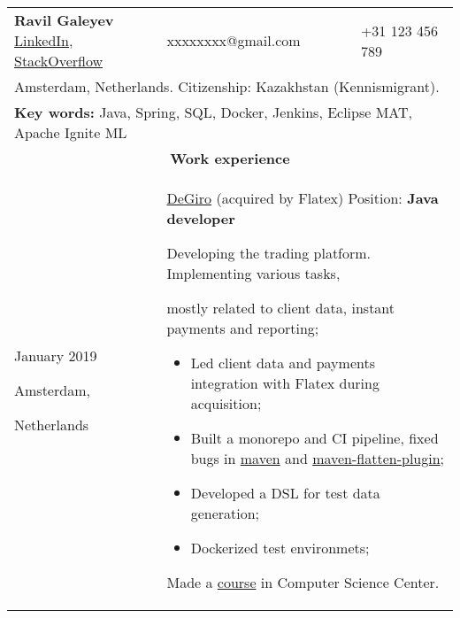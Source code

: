 \documentclass{article}
\begin{document}
\begin{longtable}{p{0.00in}p{0.00in}p{0.0in}p{0.00in}p{0.00in}}
\multicolumn{3}{p{\dimexpr3.00in+4\tabcolsep\relax}}{{\fontsize{16pt}{19.2pt}\selectfont
    \textbf{Ravil Galeyev}}
    \href{https://www.linkedin.com/in/ravil-galeyev-9a7540102}{LinkedIn},
    \href{http://stackoverflow.com/story/dehasi}{StackOverflow}
} &
\multicolumn{1}{l}{xxxxxxxx@gmail.com} &
\multicolumn{1}{l}{+31 123 456 789} \\

\multicolumn{5}{p{\dimexpr7.00in+8\tabcolsep\relax}}{
    Amsterdam, Netherlands. Citizenship: Kazakhstan (Kennismigrant).
\par} \\

\multicolumn{5}{p{\dimexpr7.00in+8\tabcolsep\relax}}{
    \textbf{Key words:} Java, Spring, SQL, Docker, Jenkins, Eclipse MAT, Apache Ignite ML
\par} \\

\multicolumn{5}{c}{\textbf{Work experience}} \\

\multicolumn{2}{p{\dimexpr1.00in+2\tabcolsep\relax}}{January 2019 \par Amsterdam,\par Netherlands} &
\multicolumn{3}{p{\dimexpr5.85in+4\tabcolsep\relax}}{\href{https://degiro.nl}{DeGiro} (acquired by Flatex)
Position: \textbf{Java developer} \par
Developing the trading platform. Implementing various tasks,
\par mostly related to client data, instant payments and reporting;
\begin{itemize}
    \item Led client data and payments integration with Flatex during acquisition;
    \item Built a monorepo and CI pipeline, fixed bugs in
          \href{https://github.com/apache/maven/pull/347}{maven}
           and  \href{https://github.com/mojohaus/flatten-maven-plugin/pull/152}{maven-flatten-plugin};
    \item Developed a DSL for test data generation;
    \item Dockerized test environmets;
    \end{itemize}
    Made a \href{https://compscicenter.ru/courses/practical-minimum/}{course} in Computer Science Center.
\par} \\


\end{longtable}
\end{document}
